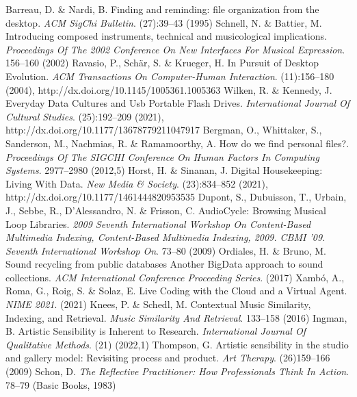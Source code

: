 \documentclass[runningheads,a4paper]{cmmr2023}
\begin{document}
\begin{thebibliography}{4}
Barreau, D. \& Nardi, B. Finding and reminding: file organization from the desktop. {\em ACM SigChi Bulletin}. (27):39--43 (1995)
Schnell, N. \& Battier, M. Introducing composed instruments, technical and musicological implications. {\em Proceedings Of The 2002 Conference On New Interfaces For Musical Expression}. 156--160 (2002)
Ravasio, P., Schär, S. \& Krueger, H. In Pursuit of Desktop Evolution. {\em ACM Transactions On Computer-Human Interaction}. (11):156--180 (2004), http://dx.doi.org/10.1145/1005361.1005363
Wilken, R. \& Kennedy, J. Everyday Data Cultures and Usb Portable Flash Drives. {\em International Journal Of Cultural Studies}. (25):192--209 (2021), http://dx.doi.org/10.1177/13678779211047917
Bergman, O., Whittaker, S., Sanderson, M., Nachmias, R. \& Ramamoorthy, A. How do we find personal files?. {\em Proceedings Of The SIGCHI Conference On Human Factors In Computing Systems}. 2977--2980 (2012,5)
Horst, H. \& Sinanan, J. Digital Housekeeping: Living With Data. {\em New Media \& Society}. (23):834--852 (2021), http://dx.doi.org/10.1177/1461444820953535
Dupont, S., Dubuisson, T., Urbain, J., Sebbe, R., D'Alessandro, N. \& Frisson, C. AudioCycle: Browsing Musical Loop Libraries. {\em 2009 Seventh International Workshop On Content-Based Multimedia Indexing, Content-Based Multimedia Indexing, 2009. CBMI '09. Seventh International Workshop On}. 73--80 (2009)
Ordiales, H. \& Bruno, M. Sound recycling from public databases Another BigData approach to sound collections. {\em ACM International Conference Proceeding Series}. (2017)
Xamb\'{o}, A., Roma, G., Roig, S. \& Solaz, E. Live Coding with the Cloud and a Virtual Agent. {\em NIME 2021}. (2021)
Knees, P. \& Schedl, M. Contextual Music Similarity, Indexing, and Retrieval. {\em Music Similarity And Retrieval}. 133--158 (2016)
Ingman, B. Artistic Sensibility is Inherent to Research. {\em International Journal Of Qualitative Methods}. (21) (2022,1)
Thompson, G. Artistic sensibility in the studio and gallery model: Revisiting process and product. {\em Art Therapy}. (26)159--166 (2009)
Schon, D. {\em The Reflective Practitioner: How Professionals Think In Action}. 78--79 (Basic Books, 1983)

\end{thebibliography}
\end{document}
